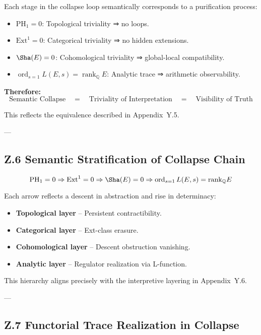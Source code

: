 Each stage in the collapse loop semantically corresponds to a purification process:

\begin{itemize}
  \item \( \mathrm{PH}_1 = 0 \): Topological triviality ⇒ no loops.
  \item \( \mathrm{Ext}^1 = 0 \): Categorical triviality ⇒ no hidden extensions.
  \item \( \Sha(E) = 0 \): Cohomological triviality ⇒ global-local compatibility.
  \item \( \operatorname{ord}_{s=1} L(E,s) = \operatorname{rank}_\mathbb{Q} E \): Analytic trace ⇒ arithmetic observability.
\end{itemize}

\textbf{Therefore:}
\[
\text{Semantic Collapse} \quad = \quad \text{Triviality of Interpretation} \quad = \quad \text{Visibility of Truth}
\]

This reflects the equivalence described in Appendix~Y.5.

---

\subsection*{Z.6 Semantic Stratification of Collapse Chain}

\[
\mathrm{PH}_1 = 0 \Rightarrow \mathrm{Ext}^1 = 0 \Rightarrow \Sha(E) = 0 \Rightarrow \operatorname{ord}_{s=1} L(E,s) = \mathrm{rank}_\mathbb{Q} E
\]

Each arrow reflects a descent in abstraction and rise in determinacy:

\begin{itemize}
  \item \textbf{Topological layer} – Persistent contractibility.
  \item \textbf{Categorical layer} – Ext-class erasure.
  \item \textbf{Cohomological layer} – Descent obstruction vanishing.
  \item \textbf{Analytic layer} – Regulator realization via L-function.
\end{itemize}

This hierarchy aligns precisely with the interpretive layering in Appendix~Y.6.

---

\subsection*{Z.7 Functorial Trace Realization in Collapse}

